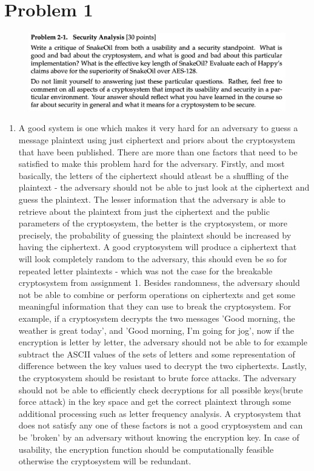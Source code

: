 \documentclass{ashoka-crypto}
\author{Aryan Nath} %
\begin{document}
\section*{Problem 1}
\begin{figure}[h]
\includegraphics[width=17cm]{1}
\centering
\end{figure}
\begin{enumerate}[label=(\alph*)]
\item A good system is one which makes it very hard for an adversary to guess a message plaintext using just ciphertext and priors about the cryptosystem that have been published. There are more than one factors that need to be satisfied to make this problem hard for the adversary. Firstly, and most basically, the letters of the ciphertext should atleast be a shuffling of the plaintext - the adversary should not be able to just look at the ciphertext and guess the plaintext. The lesser information that the adversary is able to retrieve about the plaintext from just the ciphertext and the public parameters of the cryptosystem, the better is the cryptosystem, or more precisely, the probability of guessing the plaintext should be increased by having the ciphertext. A good cryptosystem will produce a ciphertext that will look completely random to the adversary, this should even be so for repeated letter plaintexts - which was not the case for the breakable cryptosystem from assignment 1. Besides randomness, the adversary should not be able to combine or perform operations on ciphertexts and get some meaningful information that they can use to break the cryptosystem. For example, if a cryptosystem decrypts the two messages 'Good morning, the weather is great today', and 'Good morning, I'm going for jog', now if the encryption is letter by letter, the adversary should not be able to for example subtract the ASCII values of the sets of letters and some representation of difference between the key values used to decrypt the two ciphertexts. Lastly, the cryptosystem should be resistant to brute force attacks. The adversary should not be able to efficiently check decryptions for all possible keys(brute force attack) in the key space and get the correct plaintext through some additional processing such as letter frequency analysis. A cryptosystem that does not satisfy any one of these factors is not a good cryptosystem and can be 'broken' by an adversary without knowing the encryption key. In case of usability, the encryption function should be computationally feasible otherwise the cryptosystem will be redundant.

\end{enumerate}
\end{document}
